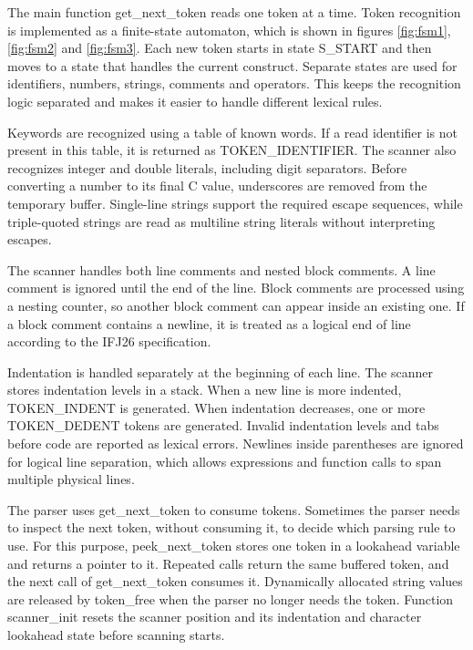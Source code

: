 \documentclass[a4paper,11pt]{article}
\begin{document}
The main function get\_next\_token reads one token at a time. Token recognition
is implemented as a finite-state automaton, which is shown in figures \ref{fig:fsm1},
\ref{fig:fsm2} and \ref{fig:fsm3}. Each new token starts in state S\_START and
then moves to a state that handles the current construct. Separate states are used for
identifiers, numbers, strings, comments and operators. This keeps the recognition logic
separated and makes it easier to handle different lexical rules.

Keywords are recognized using a table of known words. If a read identifier is not present
in this table, it is returned as TOKEN\_IDENTIFIER. The scanner also recognizes
integer and double literals, including digit separators. Before converting a number to its
final C value, underscores are removed from the temporary buffer. Single-line strings
support the required escape sequences, while triple-quoted strings are read as multiline
string literals without interpreting escapes.

The scanner handles both line comments and nested block comments. A line comment is
ignored until the end of the line. Block comments are processed using a nesting counter,
so another block comment can appear inside an existing one. If a block comment contains a
newline, it is treated as a logical end of line according to the IFJ26 specification.

Indentation is handled separately at the beginning of each line. The scanner stores
indentation levels in a stack. When a new line is more indented, TOKEN\_INDENT is
generated. When indentation decreases, one or more TOKEN\_DEDENT tokens are
generated. Invalid indentation levels and tabs before code are reported as lexical errors.
Newlines inside parentheses are ignored for logical line separation, which allows
expressions and function calls to span multiple physical lines.

The parser uses get\_next\_token to consume tokens. Sometimes the parser needs to
inspect the next token, without consuming it, to decide which parsing rule to use. For
this purpose, peek\_next\_token stores one token in a lookahead variable and
returns a pointer to it. Repeated calls return the same buffered token, and the next call
of get\_next\_token consumes it. Dynamically allocated string values are released
by token\_free when the parser no longer needs the token. Function
scanner\_init resets the scanner position and its indentation and character
lookahead state before scanning starts.
\end{document}
